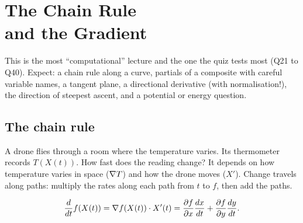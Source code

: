 \chapter[The Chain Rule and the Gradient]{The Chain Rule\\ and the Gradient}\label{ch:two}

\begin{examnote}
This is the most ``computational'' lecture and the one the quiz tests most (Q21 to Q40).
Expect: a chain rule along a curve, partials of a composite with careful variable names, a
tangent plane, a directional derivative (with normalisation!), the direction of steepest
ascent, and a potential or energy question.
\end{examnote}

\section{The chain rule}

\begin{intuition}
A drone flies through a room where the temperature varies. Its thermometer records
$T(X(t))$. How fast does the reading change? It depends on how temperature varies in space
($\nabla T$) and how the drone moves ($X'$). Change travels along paths: multiply the rates
along each path from $t$ to $f$, then add the paths.
\end{intuition}

\begin{center}
\[
\frac{d}{dt}f(X(t))=\nabla f(X(t))\cdot X'(t)=\frac{\partial f}{\partial x}\frac{dx}{dt}+\frac{\partial f}{\partial y}\frac{dy}{dt}.
\]
\end{center}

